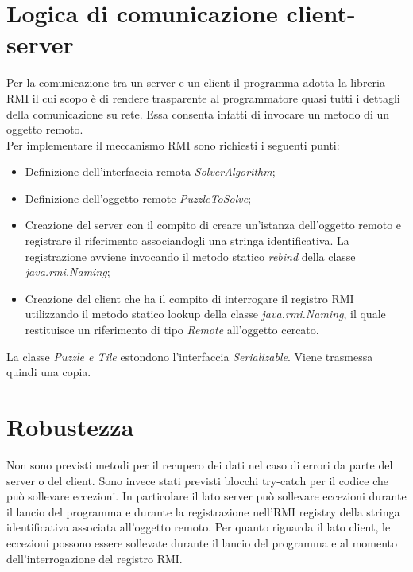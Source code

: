 \documentclass[13pt]{article}
\begin{document}
\newpage
\section{Logica di comunicazione client-server}
Per la comunicazione tra un server e un client il programma adotta la libreria RMI il cui scopo è di rendere trasparente al programmatore quasi tutti i dettagli della comunicazione su rete. Essa consenta infatti di invocare un metodo di un oggetto remoto.\\
Per implementare il meccanismo RMI sono richiesti i seguenti punti:
\begin{itemize}
	\item Definizione dell'interfaccia remota \textit{SolverAlgorithm};
	\item Definizione dell'oggetto remote \textit{PuzzleToSolve};
	\item Creazione del server con il compito di creare un'istanza dell'oggetto remoto e registrare il riferimento associandogli una stringa identificativa. La registrazione avviene invocando il metodo statico \textit{rebind} della classe \textit{java.rmi.Naming};
	\item Creazione del client che ha il compito di interrogare il registro RMI utilizzando il metodo statico lookup della classe \textit{java.rmi.Naming}, il quale restituisce un riferimento di tipo \textit{Remote} all'oggetto cercato.
\end{itemize}
La classe \textit{Puzzle e Tile} estondono l'interfaccia \textit{Serializable}. Viene trasmessa quindi una copia.

\newpage
\section{Robustezza}
Non sono previsti metodi per il recupero dei dati nel caso di errori da parte del server o del client. Sono invece stati previsti blocchi try-catch per il codice che può sollevare eccezioni. In particolare il lato server può sollevare eccezioni durante il lancio del programma e durante la registrazione nell'RMI registry della stringa identificativa associata all'oggetto remoto. Per quanto riguarda il lato client, le eccezioni possono essere sollevate durante il lancio del programma e al momento dell'interrogazione  del registro RMI. 
\end{document}
